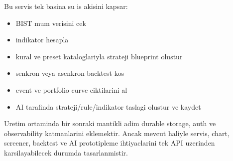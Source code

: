 \documentclass[11pt,a4paper]{article}
\begin{document}
Bu servis tek basina su is akisini kapsar:

\begin{itemize}[leftmargin=1.5em]
    \item BIST mum verisini cek
    \item indikator hesapla
    \item kural ve preset kataloglariyla strateji blueprint olustur
    \item senkron veya asenkron backtest kos
    \item event ve portfolio curve ciktilarini al
    \item AI tarafinda strateji/rule/indikator taslagi olustur ve kaydet
\end{itemize}

Uretim ortaminda bir sonraki mantikli adim durable storage, auth ve observability katmanlarini eklemektir. Ancak mevcut haliyle servis, chart, screener, backtest ve AI prototipleme ihtiyaclarini tek API uzerinden karsilayabilecek durumda tasarlanmistir.
\end{document}
